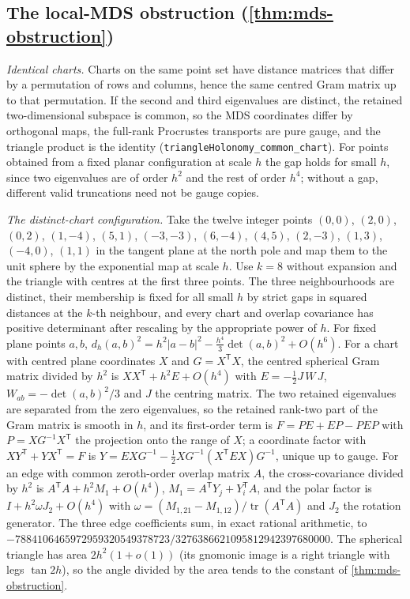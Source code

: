\documentclass[11pt]{article}
\newcommand{\lean}[1]{\nolinkurl{#1}}
\begin{document}
\subsection{The local-MDS obstruction (\texorpdfstring{\cref{thm:mds-obstruction}}{Theorem 7.2})}
\label{app:mds-proof}

\emph{Identical charts.}
Charts on the same point set have distance matrices that differ by a permutation of rows and columns, hence the same centred Gram matrix up to that permutation.
If the second and third eigenvalues are distinct, the retained two-dimensional subspace is common, so the MDS coordinates differ by orthogonal maps, the full-rank Procrustes transports are pure gauge, and the triangle product is the identity (\lean{triangleHolonomy_common_chart}). For points obtained from a fixed planar configuration at scale $h$ the gap holds for small $h$, since two eigenvalues are of order $h^2$ and the rest of order $h^4$; without a gap, different valid truncations need not be gauge copies.

\emph{The distinct-chart configuration.}
Take the twelve integer points
$(0,0)$, $(2,0)$, $(0,2)$, $(1,-4)$, $(5,1)$, $(-3,-3)$, $(6,-4)$, $(4,5)$, $(2,-3)$, $(1,3)$, $(-4,0)$, $(1,1)$
in the tangent plane at the north pole and map them to the unit sphere by the exponential map at scale $h$.
Use $k=8$ without expansion and the triangle with centres at the first three points.
The three neighbourhoods are distinct, their membership is fixed for all small $h$ by strict gaps in squared distances at the $k$-th neighbour, and every chart and overlap covariance has positive determinant after rescaling by the appropriate power of $h$.
For fixed plane points $a,b$, $d_h(a,b)^2=h^2|a-b|^2-\tfrac{h^4}{3}\det(a,b)^2+O(h^6)$.
For a chart with centred plane coordinates $X$ and $G=X^{\mathsf T}X$, the centred spherical Gram matrix divided by $h^2$ is $XX^{\mathsf T}+h^2E+O(h^4)$ with $E=-\tfrac12J\,W\,J$, $W_{ab}=-\det(a,b)^2/3$ and $J$ the centring matrix.
The two retained eigenvalues are separated from the zero eigenvalues, so the retained rank-two part of the Gram matrix is smooth in $h$, and its first-order term is $F=PE+EP-PEP$ with $P=XG^{-1}X^{\mathsf T}$ the projection onto the range of $X$; a coordinate factor with $XY^{\mathsf T}+YX^{\mathsf T}=F$ is $Y=EXG^{-1}-\tfrac12XG^{-1}(X^{\mathsf T}EX)G^{-1}$, unique up to gauge.
For an edge with common zeroth-order overlap matrix $A$, the cross-covariance divided by $h^2$ is $A^{\mathsf T}A+h^2M_1+O(h^4)$, $M_1=A^{\mathsf T}Y_j+Y_i^{\mathsf T}A$, and the polar factor is $I+h^2\omega J_2+O(h^4)$ with $\omega=(M_{1,21}-M_{1,12})/\operatorname{tr}(A^{\mathsf T}A)$ and $J_2$ the rotation generator.
The three edge coefficients sum, in exact rational arithmetic, to $-7884106465972959320549378723/3276386621095812942397680000$.
The spherical triangle has area $2h^2(1+o(1))$ (its gnomonic image is a right triangle with legs $\tan 2h$), so the angle divided by the area tends to the constant of \cref{thm:mds-obstruction}.
\end{document}

